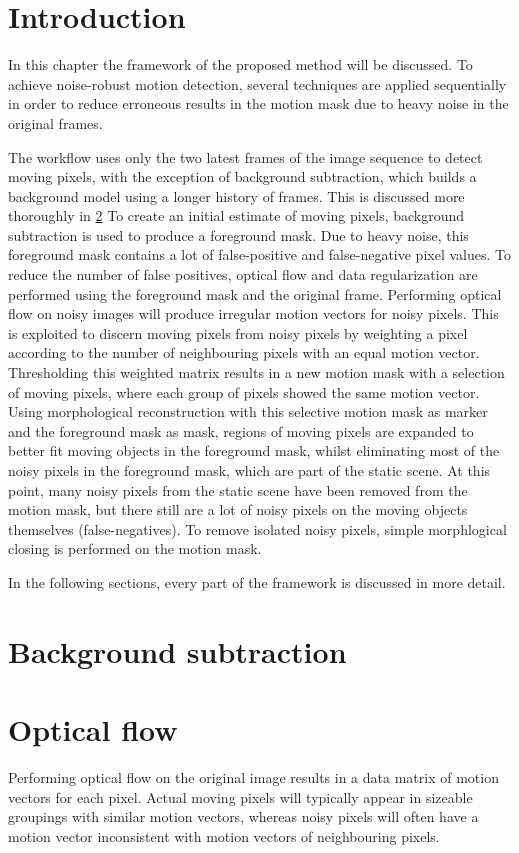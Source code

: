\section{Introduction}
In this chapter the framework of the proposed method will be discussed.
To achieve noise-robust motion detection, several techniques are applied sequentially in order to reduce erroneous results in the motion mask due to heavy noise in the original frames.

The workflow uses only the two latest frames of the image sequence to detect moving pixels, with the exception of background subtraction, which builds a background model using a longer history of frames. This is discussed more thoroughly in \ref{background_subtraction}
To create an initial estimate of moving pixels, background subtraction is used to produce a foreground mask.
Due to heavy noise, this foreground mask contains a lot of false-positive and false-negative pixel values.
To reduce the number of false positives, optical flow and data regularization are performed using the foreground mask and the original frame.
Performing optical flow on noisy images will produce irregular motion vectors for noisy pixels.
This is exploited to discern moving pixels from noisy pixels by weighting a pixel according to the number of neighbouring pixels with an equal motion vector.
Thresholding this weighted matrix results in a new motion mask with a selection of moving pixels, where each group of pixels showed the same motion vector.
Using morphological reconstruction with this selective motion mask as marker and the foreground mask as mask, regions of moving pixels are expanded to better fit moving objects in the foreground mask, whilst eliminating most of the noisy pixels in the foreground mask, which are part of the static scene.
At this point, many noisy pixels from the static scene have been removed from the motion mask, but there still are a lot of noisy pixels on the moving objects themselves (false-negatives).
To remove isolated noisy pixels, simple morphlogical closing is performed on the motion mask.

In the following sections, every part of the framework is discussed in more detail.

\section{Background subtraction}
\label{background_subtraction}

\section{Optical flow}
Performing optical flow on the original image results in a data matrix of motion vectors for each pixel.
Actual moving pixels will typically appear in sizeable groupings with similar motion vectors, whereas noisy pixels will often have a motion vector inconsistent with motion vectors of neighbouring pixels.

